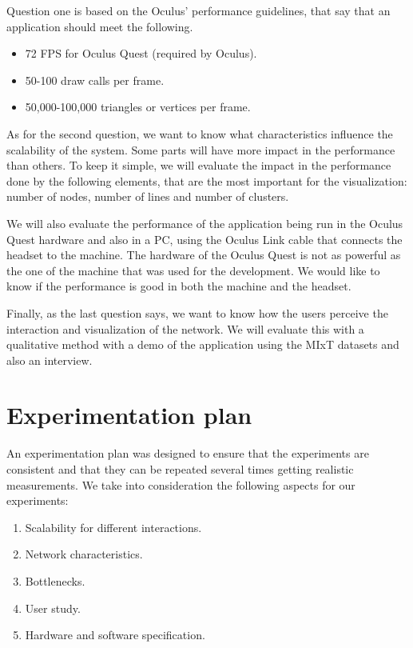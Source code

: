 Question one is based on the Oculus' performance guidelines\cite{oculus_performance_baselines}, that say that an application should meet the following.
\begin{itemize}
  \item 72 FPS for Oculus Quest (required by Oculus).
  \item 50-100 draw calls per frame.
  \item 50,000-100,000 triangles or vertices per frame.
\end{itemize}

As for the second question, we want to know what characteristics influence the scalability of the system. Some parts will have more impact in the performance than others. To keep it simple, we will evaluate the impact in the performance done by the following elements, that are the most important for the visualization: number of nodes, number of lines and number of clusters.

We will also evaluate the performance of the application being run in the Oculus Quest hardware and also in a PC, using the Oculus Link cable that connects the headset to the machine. The hardware of the Oculus Quest is not as powerful as the one of the machine that was used for the development. We would like to know if the performance is good in both the machine and the headset.

Finally, as the last question says, we want to know how the users perceive the interaction and visualization of the network. We will evaluate this with a qualitative method with a demo of the application using the MIxT datasets and also an interview.

\section{Experimentation plan}
An experimentation plan was designed to ensure that the experiments are consistent and that they can be repeated several times getting realistic measurements. We take into consideration the following aspects for our experiments:
\begin{enumerate}
  \item Scalability for different interactions.
  \item Network characteristics.
  \item Bottlenecks.
  \item User study.
  \item Hardware and software specification.
\end{enumerate}

